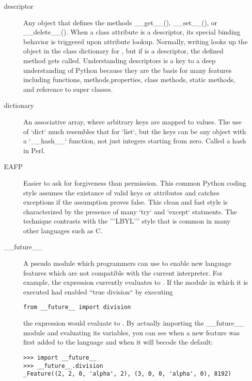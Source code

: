 \begin{description}
\item[descriptor]{Any object that defines the methods __get__(), __set__(),
or __delete__().  When a class attribute is a descriptor, its special
binding behavior is triggered upon attribute lookup.  Normally, writing
{} looks up the object  in the class dictionary for ,
but if  is a descriptor, the defined method gets called.
Understanding descriptors is a key to a deep understanding of Python because
they are the basis for many features including functions,
methods,properties, class methods, static methods, and reference to super
classes.}

\item[dictionary]{An associative array, where arbitrary keys are mapped to
values.  The use of `dict` much resembles that for `list`, but the keys can
be any object with a `__hash__` function, not just integers starting from
zero.  Called a hash in Perl.}

\item[EAFP]{Easier to ask for forgiveness than permission.  This common
Python coding style assumes the existance of valid keys or attributes and
catches exceptions if the assumption proves false.  This clean and fast
style is characterized by the presence of many `try` and `except` statments.
The technique contrasts with the '''LBYL''' style that is common in many
other languages such as C.}

\item[__future__]{A pseudo module which programmers can use to enable
new language features which are not compatible with the current interpreter.
For example, the expression  currently evaluates to .
If the module in which it is executed had enabled ``true division`` by
executing}

\begin{verbatim}
from __future__ import division
\end{verbatim}

the expression  would evaluate to .  By actually
importing the __future__ module and evaluating its variables, you can see
when a new feature was first added to the language and when it will becode
the default:

\begin{verbatim}
>>> import __future__
>>> __future__.division
_Feature((2, 2, 0, 'alpha', 2), (3, 0, 0, 'alpha', 0), 8192)
\end{verbatim}


\end{description}
